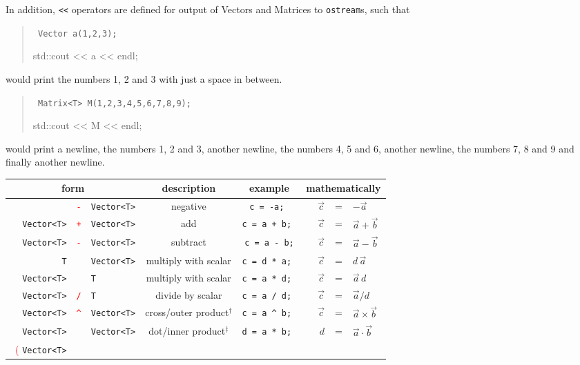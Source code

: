 \documentclass[12pt,twoside]{article}
\begin{document}
In addition, \texttt{<<} operators are defined for output of Vectors
and Matrices to \texttt{ostream}s, such that
\begin{quote}\tt
  Vector a(1,2,3);

  std::cout << a << endl;
\end{quote}
would print the numbers 1, 2 and 3 with just a space in between.
\begin{quote}\tt
  Matrix<T> M(1,2,3,4,5,6,7,8,9);

  std::cout << M << endl;
\end{quote}
would print a newline, the numbers 1, 2 and 3, another newline, the
numbers 4, 5 and 6, another newline, the numbers 7, 8 and 9 and
finally another newline.

\begin{table}[t]\small
\begin{center}
\begin{tabular}{|rcl|c|c|rcl|}
\hline
 \multicolumn{3}{|c|}{\bf form} & \bf description & \bf example & \multicolumn{3}{c|}{\bf mathematically}\\\hline\hline
%
&\texttt{\textcolor{red}-}
&\texttt{Vector<T>}  
& negative 
& \tt c = -a; 
& $\quad \vec c$&=&$-\vec a$\\
%
\texttt{Vector<T>}
&\textcolor{red}{\texttt +}
&\texttt{Vector<T>} 
& add 
& \tt c = a + b; 
& $\quad \vec c$&=&$\vec a +\vec b$\\
%
\texttt{Vector<T>}
&\textcolor{red}{\texttt -}
&\texttt{Vector<T>} 
& subtract
& \tt c = a - b;
& $\quad \vec c$&=&$\vec a -\vec b$\\
%
\texttt{T}
&\textcolor{red}{\texttt *}
&\texttt{Vector<T>} 
& multiply with scalar 
& \tt c = d * a; 
& $\quad \vec c$&=&$d\,\vec a$\\
%
\texttt{Vector<T>}
&\textcolor{red}{\texttt *} 
&\texttt{T} 
& multiply with scalar 
& \tt c = a * d; 
& $\quad \vec c$&=&$\vec a\, d$\\
%
\texttt{Vector<T>}
&\textcolor{red}{\texttt /}
&\texttt{T} 
& divide by scalar 
& \tt c = a / d; 
& $\quad \vec c$&=&$\vec a / d$\\
%
\texttt{Vector<T>} 
&\textcolor{red}{\texttt \^{}} 
&\texttt{Vector<T>} 
& cross/outer product$^\dagger$
& \tt c = a \^{} b; 
& $\quad \vec c$&=&$\vec a \times \vec b$\\
%
\texttt{Vector<T>}
&\textcolor{red}{\texttt *}
&\texttt{Vector<T>} 
& dot/inner product$^\ddagger$
& \tt d = a * b; 
& $\quad d$&=&$\vec a \cdot \vec b$\\
%
\ \textcolor{red}( \texttt{Vector<T>} 

\end{tabular}
\end{center}
\end{table}
\end{document}
